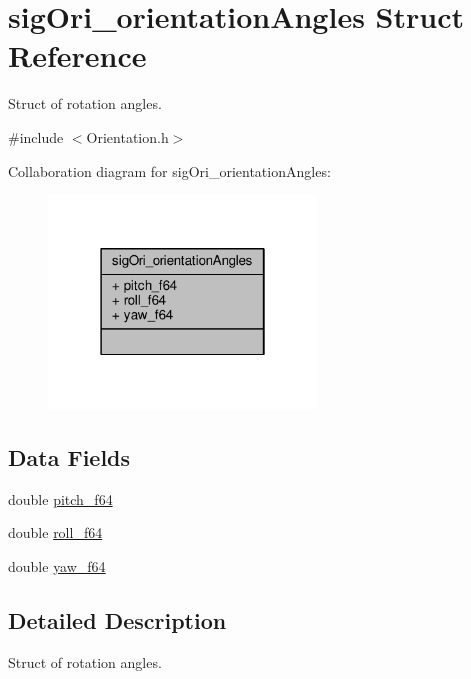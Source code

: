 \hypertarget{structsigOri__orientationAngles}{\section{sig\+Ori\+\_\+orientation\+Angles Struct Reference}
\label{structsigOri__orientationAngles}
}


Struct of rotation angles.  




{\ttfamily \#include $<$Orientation.\+h$>$}



Collaboration diagram for sig\+Ori\+\_\+orientation\+Angles\+:
\nopagebreak
\begin{figure}[H]
\begin{center}
\leavevmode
\includegraphics[width=202pt]{structsigOri__orientationAngles__coll__graph}
\end{center}
\end{figure}
\subsection*{Data Fields}
\begin{DoxyCompactItemize}
\item 
double \hyperlink{structsigOri__orientationAngles_a36aa8568f26ce93d16385822cf2e76de_a36aa8568f26ce93d16385822cf2e76de}{pitch\+\_\+f64}
\item 
double \hyperlink{structsigOri__orientationAngles_a0bdf621a53623bc73765e918e368c76e_a0bdf621a53623bc73765e918e368c76e}{roll\+\_\+f64}
\item 
double \hyperlink{structsigOri__orientationAngles_a4d2dd55644a4f5484f1809f64f14e792_a4d2dd55644a4f5484f1809f64f14e792}{yaw\+\_\+f64}
\end{DoxyCompactItemize}


\subsection{Detailed Description}
Struct of rotation angles. 



